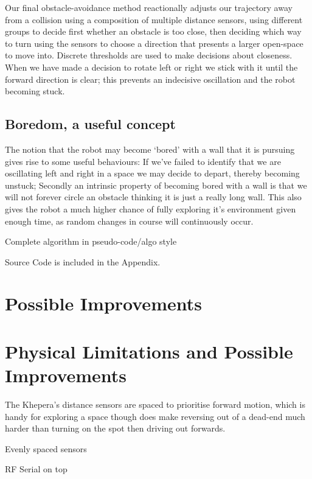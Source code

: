 \documentclass[11pt, a4paper]{article}
\begin{document}
Our final obstacle-avoidance method reactionally adjusts our trajectory away from a 
collision using a composition of multiple distance sensors, using different groups to 
decide first whether an obstacle is too close, then deciding which way to turn using 
the sensors to choose a direction that presents a larger open-space to move into.
Discrete thresholds are used to make decisions about closeness. When we have made a 
decision to rotate left or right we stick with it until the forward direction is clear; 
this prevents an indecisive oscillation and the robot becoming stuck.

\subsection{Boredom, a useful concept}

The notion that the robot may become `bored' with a wall that it is pursuing gives 
rise to some useful behaviours: If we've failed to identify that we are oscillating 
left and right in a space we may decide to depart, thereby becoming unstuck; Secondly 
an intrinsic property of becoming bored with a wall is that we will not forever circle 
an obstacle thinking it is just a really long wall. This also gives the robot a much 
higher chance of fully exploring it's environment given enough time, as random changes 
in course will continuously occur.

Complete algorithm in pseudo-code/algo style

Source Code is included in the Appendix.



\section{Possible Improvements}

\section{Physical Limitations and Possible Improvements}

The Khepera's distance sensors are spaced to prioritise forward motion, which is handy 
for exploring a space though does make reversing out of a dead-end much harder than 
turning on the spot then driving out forwards.

Evenly spaced sensors

RF Serial on top
\end{document}

